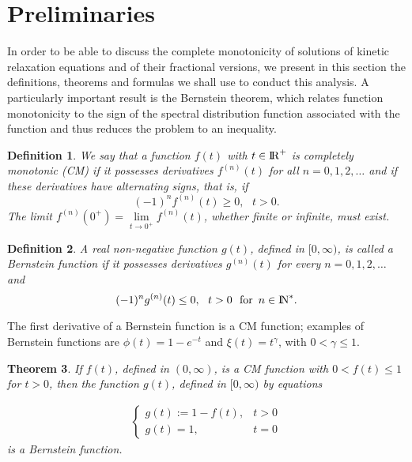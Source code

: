 \documentclass[12pt]{amsart}
\numberwithin{equation}{section}
\newtheorem{teo}{Theorem}[section]
\newtheorem{defi}[teo]{Definition}
\newcommand{\real}{{\rm I\!R}}
\newcommand{\nat}{{\rm I\!N}}
\begin{document}
\section{Preliminaries}

In order to be able to discuss the complete monotonicity of solutions
of kinetic relaxation equations and of their fractional versions, we
present in this section the definitions, theorems and formulas we shall use
to conduct this analysis. A particularly important result is the Bernstein
theorem, which relates function monotonicity to the sign of the spectral
distribution function associated with the function and thus reduces the
problem to an inequality.

\begin{defi} We say that a function $f(t)$ with $t \in \real^{+}$ is
	completely monotonic {\rm{(CM)}} if it possesses derivatives $f^{(n)}(t)$
	for all $n=0,1,2,\dots$ and if these derivatives have alternating
	signs, that is, if 
	\begin{equation}
		(-1)^nf^{(n)}(t)\geq 0,\,\,\,\,t>0.
	\end{equation}
	The limit $f^{(n)}(0^{+})=\underset{t \rightarrow
0^+}{\lim} f^{(n)}(t)$, whether finite or infinite, must exist.
\end{defi}
\begin{defi}
A real non-negative function $g(t)$, defined in $[0,\infty)$, is called a
	Bernstein function if it possesses derivatives $g^{(n)}(t)$ for
	every $n=0,1,2,\dots$ and  
\begin{equation}
(-1)^ng^{(n)}(t)\leq0,\,\,\,\,t>0\,\,\,\,\mbox{for}\,\,\,n\in \nat ^*.
\end{equation}
\end{defi}

The first derivative of a Bernstein function is a CM function; examples of
Bernstein functions are $\phi(t)=1-e^{-t}$ and $\xi(t)=t^{\gamma}$, with
$0<\gamma\leq1$.

\begin{teo}

If $f(t)$, defined in $(0,\infty)$, is a  {\rm{CM}} function with 
	$0<f(t)\leq1$ for $t>0$, then the function $g(t)$, defined in 
	$[0,\infty)$ by equations 

\begin{eqnarray}
\begin{cases}
g(t):=1-f(t), & t>0 \\
g(t)=1, & t=0 
\end{cases}
\end{eqnarray}
is a Bernstein function.
\label{teofB}
\end{teo} 
\end{document}
